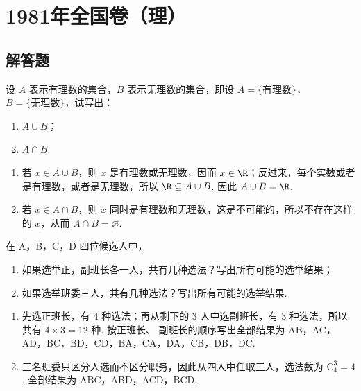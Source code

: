 \documentclass[UTF8,a4paper,oneside,11pt]{ctexbook}
\begin{document}
\mainmatter

\chapter{1981年全国卷（理）}

\section{解答题}

\begin{problem}
设 \(A\) 表示有理数的集合，\(B\) 表示无理数的集合，即设 \(A = \{\text{有理数}\}\)，\(B = \{\text{无理数}\}\)，试写出：

\begin{enumerate}
\item \(A \cup B\)；
\item \(A \cap B\).
\end{enumerate}
\end{problem}

\begin{solution}
\begin{enumerate}
\item 若 \(x\in A\cup B\)，则 \(x\) 是有理数或无理数，因而 \(x\in\R\)；反过来，每个实数或者是有理数，或者是无理数，所以 \(\R\subseteq A\cup B\). 因此 \(A\cup B=\R\).
\item 若 \(x\in A\cap B\)，则 \(x\) 同时是有理数和无理数，这是不可能的，所以不存在这样的 \(x\)，从而 \(A\cap B=\varnothing\).
\end{enumerate}
\end{solution}

\begin{problem}
在 A，B，C，D 四位候选人中，

\begin{enumerate}
\item 如果选举正，副班长各一人，共有几种选法？写出所有可能的选举结果；
\item 如果选举班委三人，共有几种选法？写出所有可能的选举结果.
\end{enumerate}
\end{problem}

\begin{solution}
\begin{enumerate}
\item 先选正班长，有 \(4\) 种选法；再从剩下的 \(3\) 人中选副班长，有 \(3\) 种选法，所以共有 \(4\times3=12\) 种. 按正班长、
副班长的顺序写出全部结果为 AB，AC，AD，BC，BD，CD，BA，CA，DA，CB，DB，DC.
\item 三名班委只区分人选而不区分职务，因此从四人中任取三人，选法数为 \(\mathrm C_4^3=4\). 全部结果为 ABC，ABD，ACD，BCD.
\end{enumerate}
\end{solution}
\end{document}
